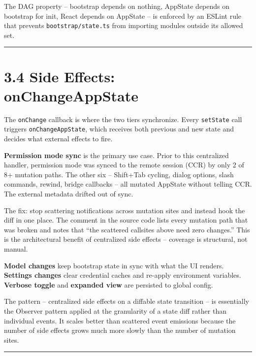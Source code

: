 \documentclass[
  english,
  11pt,
  letterpaper,
]{book}
\begin{document}
The DAG property -- bootstrap depends on nothing, AppState depends on
bootstrap for init, React depends on AppState -- is enforced by an
ESLint rule that prevents \texttt{bootstrap/state.ts} from importing
modules outside its allowed set.

\begin{center}\rule{0.5\linewidth}{0.5pt}\end{center}

\section{3.4 Side Effects:
onChangeAppState}\label{side-effects-onchangeappstate}

The \texttt{onChange} callback is where the two tiers synchronize. Every
\texttt{setState} call triggers \texttt{onChangeAppState}, which
receives both previous and new state and decides what external effects
to fire.

\textbf{Permission mode sync} is the primary use case. Prior to this
centralized handler, permission mode was synced to the remote session
(CCR) by only 2 of 8+ mutation paths. The other six -- Shift+Tab
cycling, dialog options, slash commands, rewind, bridge callbacks -- all
mutated AppState without telling CCR. The external metadata drifted out
of sync.

The fix: stop scattering notifications across mutation sites and instead
hook the diff in one place. The comment in the source code lists every
mutation path that was broken and notes that ``the scattered callsites
above need zero changes.'' This is the architectural benefit of
centralized side effects -- coverage is structural, not manual.

\textbf{Model changes} keep bootstrap state in sync with what the UI
renders. \textbf{Settings changes} clear credential caches and re-apply
environment variables. \textbf{Verbose toggle} and \textbf{expanded
view} are persisted to global config.

The pattern -- centralized side effects on a diffable state transition
-- is essentially the Observer pattern applied at the granularity of a
state diff rather than individual events. It scales better than
scattered event emissions because the number of side effects grows much
more slowly than the number of mutation sites.

\begin{center}\rule{0.5\linewidth}{0.5pt}\end{center}
\end{document}
